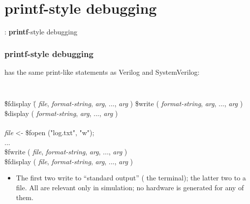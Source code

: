 
\section{{\bf printf}-style debugging}

\begin{frame}

\begin{center}
  {\LARGE {\BSV}: {\bf printf}-style debugging}
\end{center}

\end{frame}


\begin{frame}[fragile]
\frametitle{{\bf printf}-style debugging}

\footnotesize

{\BSV} has the same print-like statements as Verilog and SystemVerilog:

\vx

\hmmmm
\begin{minipage}{0.7\textwidth}\tt
\begin{tabbing}
\hmmm\= \$fdisplay \= ( {\it file}, \= {\it format-string}, {\it arg}, ..., {\it arg} ) \kill
     \> \$write    \> (             \> {\it format-string}, {\it arg}, ..., {\it arg} ) \\
     \> \$display  \> (             \> {\it format-string}, {\it arg}, ..., {\it arg} ) \\
\\
     \> {\it file} <- \$fopen ("log.txt", "w"); \\
     \> ... \\
     \> \$fwrite   \> ( {\it file}, \> {\it format-string}, {\it arg}, ..., {\it arg} ) \\
     \> \$fdisplay \> ( {\it file}, \= {\it format-string}, {\it arg}, ..., {\it arg} )
\end{tabbing}
\end{minipage}

\PAUSE{\vxx}

\begin{itemize}

    \item The first two write to ``standard output'' ({\ie} the
        terminal); the latter two to a file.  All are relevant only in
        simulation; no hardware is generated for any of them.


\end{itemize}
\end{frame}
